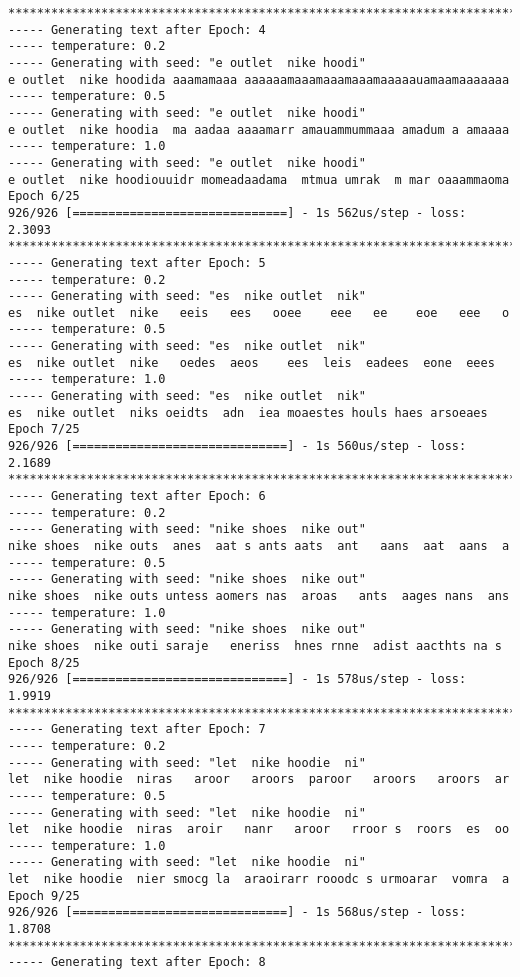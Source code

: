 \documentclass[11pt]{article}
\begin{document}
\begin{Verbatim}[commandchars=\\\{\}]
****************************************************************************
----- Generating text after Epoch: 4
----- temperature: 0.2
----- Generating with seed: "e outlet  nike hoodi"
e outlet  nike hoodida aaamamaaa aaaaaamaaamaaamaaamaaaaauamaamaaaaaaa
----- temperature: 0.5
----- Generating with seed: "e outlet  nike hoodi"
e outlet  nike hoodia  ma aadaa aaaamarr amauammummaaa amadum a amaaaa
----- temperature: 1.0
----- Generating with seed: "e outlet  nike hoodi"
e outlet  nike hoodiouuidr momeadaadama  mtmua umrak  m mar oaaammaoma
Epoch 6/25
926/926 [==============================] - 1s 562us/step - loss: 2.3093
****************************************************************************
----- Generating text after Epoch: 5
----- temperature: 0.2
----- Generating with seed: "es  nike outlet  nik"
es  nike outlet  nike   eeis   ees   ooee    eee   ee    eoe   eee   o
----- temperature: 0.5
----- Generating with seed: "es  nike outlet  nik"
es  nike outlet  nike   oedes  aeos    ees  leis  eadees  eone  eees
----- temperature: 1.0
----- Generating with seed: "es  nike outlet  nik"
es  nike outlet  niks oeidts  adn  iea moaestes houls haes arsoeaes
Epoch 7/25
926/926 [==============================] - 1s 560us/step - loss: 2.1689
****************************************************************************
----- Generating text after Epoch: 6
----- temperature: 0.2
----- Generating with seed: "nike shoes  nike out"
nike shoes  nike outs  anes  aat s ants aats  ant   aans  aat  aans  a
----- temperature: 0.5
----- Generating with seed: "nike shoes  nike out"
nike shoes  nike outs untess aomers nas  aroas   ants  aages nans  ans
----- temperature: 1.0
----- Generating with seed: "nike shoes  nike out"
nike shoes  nike outi saraje   eneriss  hnes rnne  adist aacthts na s
Epoch 8/25
926/926 [==============================] - 1s 578us/step - loss: 1.9919
****************************************************************************
----- Generating text after Epoch: 7
----- temperature: 0.2
----- Generating with seed: "let  nike hoodie  ni"
let  nike hoodie  niras   aroor   aroors  paroor   aroors   aroors  ar
----- temperature: 0.5
----- Generating with seed: "let  nike hoodie  ni"
let  nike hoodie  niras  aroir   nanr   aroor   rroor s  roors  es  oo
----- temperature: 1.0
----- Generating with seed: "let  nike hoodie  ni"
let  nike hoodie  nier smocg la  araoirarr rooodc s urmoarar  vomra  a
Epoch 9/25
926/926 [==============================] - 1s 568us/step - loss: 1.8708
****************************************************************************
----- Generating text after Epoch: 8

\end{Verbatim}
\end{document}
